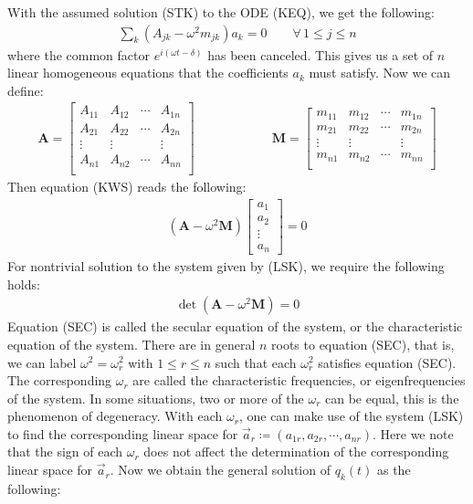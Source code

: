 \documentclass[11pt,oneside]{book}
\theoremstyle{break}
\theoremstyle{break}
\newcommand{\bmat}[1]{\begin{bmatrix}
#1
\end{bmatrix}}
\begin{document}
With the assumed solution (STK) to the ODE (KEQ), we get the following:
\begin{align*}
\sum_k (A_{jk} - \omega^2 m_{jk}) a_k = 0\qquad \forall\, 1\leq j \leq n \tag{KWS}
\end{align*}
where the common factor $e^{i(\omega t- \delta)}$ has been canceled. This gives us a set of $n$ linear homogeneous equations that the coefficients $a_k$ must satisfy. Now we can define:
\begin{align*}
\mathbf{A} = 
\bmat{
A_{11} & A_{12} & \cdots & A_{1n} \\
A_{21} & A_{22} & \cdots & A_{2n} \\
\vdots & \vdots & & \vdots\\
A_{n1} & A_{n2} & \cdots & A_{nn} \\
} \qquad\qquad\qquad 
\mathbf{M} = 
\bmat{
m_{11} & m_{12} & \cdots & m_{1n} \\
m_{21} & m_{22} & \cdots & m_{2n} \\
\vdots & \vdots & & \vdots\\
m_{n1} & m_{n2} & \cdots & m_{nn} \\
}
\end{align*}
Then equation (KWS) reads the following:
\begin{align*}
\left(\mathbf{A} - \omega^2 \mathbf{M}\right) \bmat{a_1 \\ a_2 \\ \vdots \\a_n} = 0 \tag{LSK}
\end{align*}
For nontrivial solution to the system given by (LSK), we require the following holds:
\begin{align*}
\det\left(\mathbf{A} - \omega^2 \mathbf{M}\right) = 0 \tag{SEC}
\end{align*} 
Equation (SEC) is called the secular equation of the system, or the characteristic equation of the system. There are in general $n$ roots to equation (SEC), that is, we can label $\omega^2 = \omega_r^2$ with $1\leq r \leq n$ such that each $\omega_r^2$ satisfies equation (SEC). The corresponding $\omega_r$ are called the characteristic frequencies, or eigenfrequencies of the system. In some situations, two or more of the $\omega_r$ can be equal, this is the phenomenon of degeneracy. With each $\omega_r$, one can make use of the system (LSK) to find the corresponding linear space for $\vec{a}_{r} \coloneqq (a_{1r},a_{2r},\cdots, a_{nr})$.  Here we note that the sign of each $\omega_r$ does not affect the determination of the corresponding linear space for $\vec{a}_{r}$. Now we obtain the general solution of $q_k(t)$ as the following:
\end{document}
